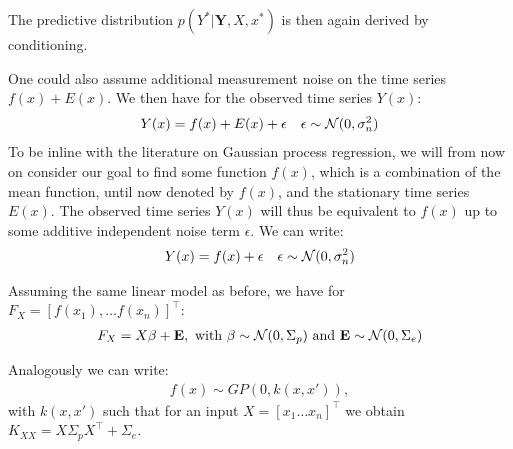 The predictive distribution $p(Y^{\ast} | \mathbf{Y}, X, x^{\ast})$ is then again derived by conditioning.

One could also assume additional measurement noise on the time series $f(x) + E(x)$.
We then have for the observed time series $Y(x)$:
\begin{align*}
    Y(x) = f(x) + E(x) + \epsilon   && \epsilon \sim \operatorname{\mathcal{N}}(0, \sigma_n^{2})
\end{align*}
To be inline with the literature on Gaussian process regression, we will from now on consider
our goal to find some function $f(x)$, which is a combination of the mean function, until now denoted by $f(x)$,
and the stationary time series $E(x)$.
The observed time series $Y(x)$ will thus be equivalent to $f(x)$ up to some additive independent noise term $\epsilon$.
We can write:
\begin{align*}
    Y(x) = f(x) + \epsilon && \epsilon \sim \operatorname{\mathcal{N}}(0, \sigma_n^{2})
\end{align*}

Assuming the same linear model as before, we have for $F_X = [f(x_1), \dots f(x_n)]^{\top}$:
\begin{gather*}
    F_X = X \beta + \mathbf{E}, \text{ with $\beta \sim \operatorname{\mathcal{N}}(0, \Sigma_p)$ and $\mathbf{E} \sim \operatorname{\mathcal{N}}(0, \Sigma_e)$}
\end{gather*}
%

Analogously we can write:
\begin{gather*}
    f(x) \sim GP(0, k(x, x')),
\end{gather*}
with $k(x,x')$ such that for an input $X = [x_1 \dots x_n]^{\top}$ we obtain $K_{XX} =  X \Sigma_p X^{\top} + \Sigma_e$.

